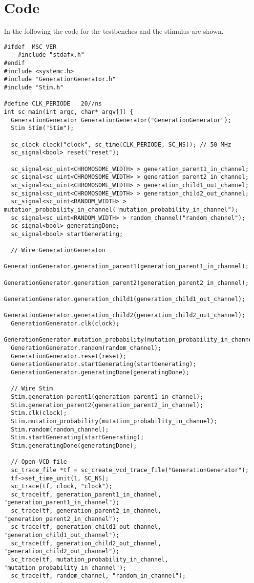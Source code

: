 \section{Code} \label{app:code}

In the following the code for the testbenches and the stimulus are shown.

\begin{lstlisting}[style=customc++,caption={Testbench for GenerationGenerator},label={lst:generatorTestbench}]
#ifdef _MSC_VER
	#include "stdafx.h"
#endif
#include <systemc.h>
#include "GenerationGenerator.h"
#include "Stim.h"

#define CLK_PERIODE   20//ns
int sc_main(int argc, char* argv[]) {
  GenerationGenerator GenerationGenerator("GenerationGenerator");
  Stim Stim("Stim");
  
  sc_clock clock("clock", sc_time(CLK_PERIODE, SC_NS)); // 50 MHz
  sc_signal<bool> reset("reset");

  sc_signal<sc_uint<CHROMOSOME_WIDTH> > generation_parent1_in_channel;
  sc_signal<sc_uint<CHROMOSOME_WIDTH> > generation_parent2_in_channel;
  sc_signal<sc_uint<CHROMOSOME_WIDTH> > generation_child1_out_channel;
  sc_signal<sc_uint<CHROMOSOME_WIDTH> > generation_child2_out_channel;
  sc_signal<sc_uint<RANDOM_WIDTH> > mutation_probability_in_channel("mutation_probability_in_channel");
  sc_signal<sc_uint<RANDOM_WIDTH> > random_channel("random_channel");
  sc_signal<bool> generatingDone;
  sc_signal<bool> startGenerating;

  // Wire GenerationGeneraton
  GenerationGenerator.generation_parent1(generation_parent1_in_channel);
  GenerationGenerator.generation_parent2(generation_parent2_in_channel);
  GenerationGenerator.generation_child1(generation_child1_out_channel);
  GenerationGenerator.generation_child2(generation_child2_out_channel);
  GenerationGenerator.clk(clock);
  GenerationGenerator.mutation_probability(mutation_probability_in_channel);
  GenerationGenerator.random(random_channel);
  GenerationGenerator.reset(reset);
  GenerationGenerator.startGenerating(startGenerating);
  GenerationGenerator.generatingDone(generatingDone);

  // Wire Stim
  Stim.generation_parent1(generation_parent1_in_channel);
  Stim.generation_parent2(generation_parent2_in_channel);
  Stim.clk(clock);
  Stim.mutation_probability(mutation_probability_in_channel);
  Stim.random(random_channel);
  Stim.startGenerating(startGenerating);
  Stim.generatingDone(generatingDone);

  // Open VCD file
  sc_trace_file *tf = sc_create_vcd_trace_file("GenerationGenerator");
  tf->set_time_unit(1, SC_NS);
  sc_trace(tf, clock, "clock");
  sc_trace(tf, generation_parent1_in_channel, "generation_parent1_in_channel");
  sc_trace(tf, generation_parent2_in_channel, "generation_parent2_in_channel");
  sc_trace(tf, generation_child1_out_channel, "generation_child1_out_channel");
  sc_trace(tf, generation_child2_out_channel, "generation_child2_out_channel");
  sc_trace(tf, mutation_probability_in_channel, "mutation_probability_in_channel");
  sc_trace(tf, random_channel, "random_in_channel");
  

\end{lstlisting}
